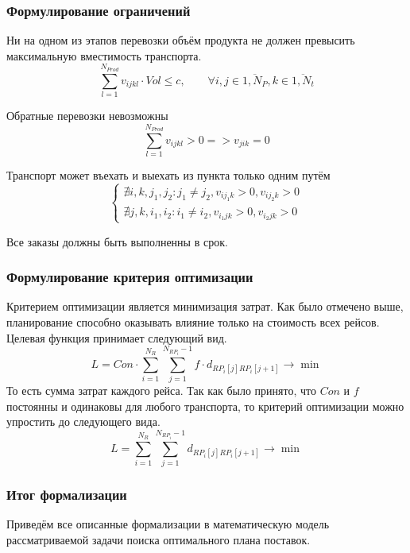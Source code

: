 	\subsubsection{Формулирование ограничений}     
	
	Ни на одном из этапов перевозки объём продукта не должен превысить максимальную вместимость транспорта.
	\begin{equation}
		\sum_{l=1}^{N_{Prod}} v_{ijkl} \cdot Vol \le c, \qquad \forall i, j \in \overline{1, N_P}, k \in \overline{1, N_t}
	\end{equation}

	Обратные перевозки невозможны
	\begin{equation}
		\sum_{l=1}^{N_{Prod}} v_{ijkl} > 0 => v_{jik} = 0
	\end{equation}

	Транспорт может въехать и выехать из пункта только одним путём
	\begin{equation}
		\left\{
		\begin{array}{ccc}
			\nexists i, k, j_1, j_2: j_1 \ne j_2, v_{ij_1k} > 0, v_{ij_2k} > 0 \\
			\nexists j, k, i_1, i_2: i_1 \ne i_2, v_{i_1jk} > 0, v_{i_2jk} > 0 
		\end{array}
		\right.
	\end{equation}

	Все заказы должны быть выполненны в срок. 
	
	\subsubsection{Формулирование критерия оптимизации}   
	Критерием оптимизации является минимизация затрат. Как было отмечено выше, планирование способно оказывать влияние только на стоимость всех рейсов. Целевая функция принимает следующий вид.
	\begin{equation}
		L = Con \cdot \sum_{i=1}^{N_R} \sum_{j=1}^{N_{RP_i} - 1} f \cdot d_{RP_i[j] RP_i[j+1]} \to \min
	\end{equation}
	То есть сумма затрат каждого рейса. Так как было принято, что $Con$ и $f$ постоянны и одинаковы для любого транспорта, то критерий оптимизации можно упростить до следующего вида.
	\begin{equation}
		L = \sum_{i=1}^{N_R} \sum_{j=1}^{N_{RP_i} - 1} d_{RP_i[j] RP_i[j+1]} \to \min
	\end{equation}

	\subsubsection*{Итог формализации}
	Приведём все описанные формализации в математическую модель рассматриваемой задачи поиска оптимального плана поставок.

